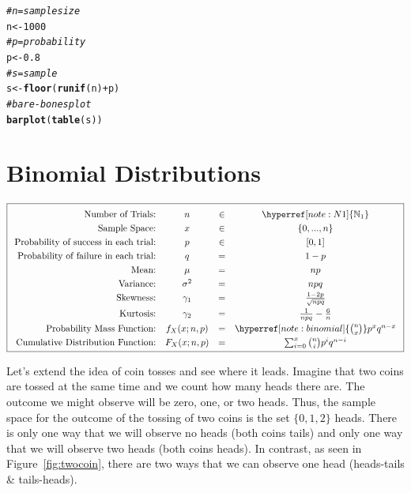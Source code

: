 \documentclass[nohyper,justified,marginals=raggedright]{tufte-book}\usepackage[]{graphicx}\usepackage[]{color}
\makeatletter
\newcommand{\hlnum}[1]{\textcolor[rgb]{0.686,0.059,0.569}{#1}}%
\newcommand{\hlcom}[1]{\textcolor[rgb]{0.678,0.584,0.686}{\textit{#1}}}%
\newcommand{\hlopt}[1]{\textcolor[rgb]{0,0,0}{#1}}%
\newcommand{\hlstd}[1]{\textcolor[rgb]{0.345,0.345,0.345}{#1}}%
\newcommand{\hlkwb}[1]{\textcolor[rgb]{0.69,0.353,0.396}{#1}}%
\newcommand{\hlkwd}[1]{\textcolor[rgb]{0.737,0.353,0.396}{\textbf{#1}}}%
\newenvironment{kframe}{%
 \def\at@end@of@kframe{}%
 \ifinner\ifhmode%
  \def\at@end@of@kframe{\end{minipage}}%
  \begin{minipage}{\columnwidth}%
 \fi\fi%
 \def\FrameCommand##1{\hskip\@totalleftmargin \hskip-\fboxsep
 \colorbox{shadecolor}{##1}\hskip-\fboxsep
     \hskip-\linewidth \hskip-\@totalleftmargin \hskip\columnwidth}%
 \MakeFramed {\advance\hsize-\width
   \@totalleftmargin\z@ \linewidth\hsize
   \@setminipage}}%
 {\par\unskip\endMakeFramed%
 \at@end@of@kframe}
\newenvironment{knitrout}{}{} %
\makeatother
\begin{document}
\begin{knitrout}
\color{fgcolor}\begin{kframe}
\begin{alltt}
\hlcom{# n = sample size}
\hlstd{n} \hlkwb{<-} \hlnum{1000}
\hlcom{# p = probability}
\hlstd{p} \hlkwb{<-} \hlnum{0.8}
\hlcom{# s = sample}
\hlstd{s} \hlkwb{<-} \hlkwd{floor}\hlstd{(}\hlkwd{runif}\hlstd{(n)} \hlopt{+} \hlstd{p)}
\hlcom{# bare-bones plot}
\hlkwd{barplot}\hlstd{(}\hlkwd{table}\hlstd{(s))}
\end{alltt}
\end{kframe}
\end{knitrout}

\section{Binomial Distributions}

\begin{equation*}
\boxed{
\setlength{\extrarowheight}{3pt}
\begin{array}{rccc}
\text{Number of Trials:} & n & \in & \hyperref [note:N1]{\mathbb{N}_1}\\
\text{Sample Space:} & x&\in&\{0,...,n\}\\
\text{Probability of success in each trial:}  &p&\in&[0,1] \\
\text{Probability of failure in each trial:}  &q&=&1-p\\
\text{Mean:} & \mu&=&np\\
\text{Variance:} & \sigma^2&=&npq\\
\text{Skewness:} & \gamma_1&=&\frac{1-2p}{\sqrt{npq}} \\
\text{Kurtosis:} & \gamma_2&=&\frac{1}{npq}-\frac{6}{n} \\
\text{Probability Mass Function:} & f_X(x;n,p)&=&\hyperref [note:binomial]{\binom{n}{x}}p^x q^{n-x} \\
\text{Cumulative Distribution Function:} & F_X(x;n,p)&=&\sum_{i=0}^{x}{\binom{n}{i}p^i q^{n-i}} \\
\end{array}
}
\end{equation*}

Let's extend the idea of coin tosses and see where it leads. Imagine that two coins are tossed at the same time and we count how many heads there are. The outcome we might observe will be zero, one, or two heads. Thus, the sample space for the outcome of the tossing of two coins is the set $\{0,1,2\}$ heads. There is only one way that we will observe no heads (both coins tails) and only one way that we will observe two heads (both coins heads). In contrast, as seen in Figure~\ref{fig:twocoin}, there are two ways that we can observe one head (heads-tails \& tails-heads).
\end{document}
